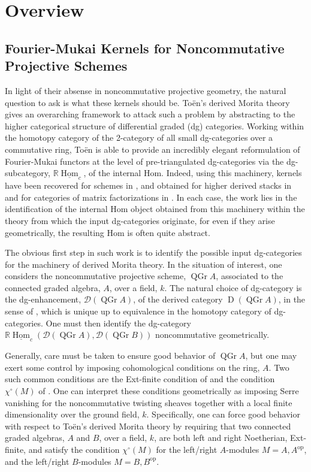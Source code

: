 \section*{Overview}
\subsection*{Fourier-Mukai Kernels for Noncommutative Projective Schemes}

In light of their absense in noncommutative projective geometry, the natural question to ask is what these kernels should be.
To\"en's derived Morita theory \parencite{Toen07} gives an overarching framework to attack such a problem by abstracting to the higher categorical structure of differential graded (dg) categories.
Working within the homotopy category of the 2-category of all small dg-categories over a commutative ring, To\"en is able to provide an incredibly elegant reformulation of Fourier-Mukai functors at the level of pre-triangulated dg-categories via the dg-subcategory, \(\mathbb{R}\underline{\operatorname{Hom}}_c\), of the internal Hom.
Indeed, using this machinery, kernels have been recovered for schemes in \parencite{Toen07}, and obtained for higher derived stacks in \parencite{BFN10} and for categories of matrix factorizations in \parencite{Dyckerhoff11,PV12,BFK14}.
In each case, the work lies in the identification of the internal Hom object obtained from this machinery within the theory from which the input dg-categories originate, for even if they arise geometrically, the resulting Hom is often quite abstract.

The obvious first step in such work is to identify the possible input dg-categories for the machinery of derived Morita theory.
In the situation of interest, one considers the noncommutative projective scheme, \(\operatorname{QGr} A\), associated to the connected graded algebra, \(A\), over a field, \(k\). 
The natural choice of dg-category is the dg-enhancement, \(\mathcal{D}(\operatorname{QGr} A)\), of the derived category \(\operatorname{D}(\operatorname{QGr} A)\), in the sense of \parencite{Lunts-Orlov}, which is unique up to equivalence in the homotopy category of dg-categories.
One must then identify the dg-category \(\mathbb{R}\underline{\operatorname{Hom}}_c(\mathcal{D}(\operatorname{QGr} A), \mathcal{D}(\operatorname{QGr} B))\) noncommutative geometrically.

Generally, care must be taken to ensure good behavior of \(\operatorname{QGr} A\), but one may exert some control by imposing cohomological conditions on the ring, \(A\).
Two such common conditions are the Ext-finite condition of \parencite{BVdB} and the condition \(\chi^\circ(M)\) of \parencite{AZ94}.
One can interpret these conditions geometrically as imposing Serre vanishing for the noncommutative twisting sheaves together with a local finite dimensionality over the ground field, \(k\).
Specifically, one can force good behavior with respect to To\"en's derived Morita theory by requiring that two connected graded algebras, \(A\) and \(B\), over a field, \(k\), are both left and right Noetherian, Ext-finite, and satisfy the condition \(\chi^\circ(M)\) for the left/right \(A\)-modules \(M = A, A^{\operatorname{op}}\), and the left/right \(B\)-modules \(M = B, B^{\operatorname{op}}\).

